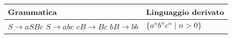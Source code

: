 \documentclass{standalone}
\begin{document}
\begin{tabularx}{\textwidth}{XX}
		Grammatica & Linguaggio derivato \\
    \midrule
        \(S \to aSBc\) \newline
        \(S \to abc\) \newline
        \(cB \to Bc\) \newline
        \(bB \to bb\)
        &
        \(\{a^nb^nc^n \mid n>0\}\)
\end{tabularx}
\end{document}
